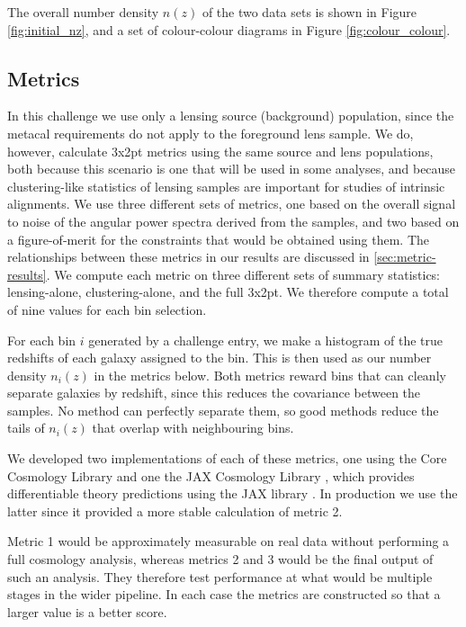 \documentclass[twocolumn,twocolappendix]{aastex63}
\begin{document}
The overall number density $n(z)$ of the two data sets is shown in Figure \ref{fig:initial_nz},
and a set of colour-colour diagrams  in Figure \ref{fig:colour_colour}.

\subsection{Metrics}
\label{sec:metrics}

In this challenge we use only a lensing source (background) population, since the metacal requirements
do not apply to the foreground lens sample. We do, however, calculate 3x2pt metrics using the
same source and lens populations, both because this scenario is one that will be used in some analyses,
and because clustering-like statistics of lensing samples are important for studies of intrinsic
alignments. We use three different sets of metrics, one based on the overall signal to noise of the angular power spectra 
derived from the samples, and two based on a figure-of-merit for the constraints that would be obtained 
using them. The relationships between these metrics in our results are discussed in \autoref{sec:metric-results}.
We compute each metric on three different sets of summary statistics: lensing-alone, clustering-alone,
and the full 3x2pt. We therefore compute a total of nine values for each bin selection.

For each bin $i$ generated by a challenge entry, we make a histogram of the true redshifts 
of each galaxy assigned to the bin.  This is then used as our number density $n_i(z)$ in the metrics 
below. Both metrics reward bins that can
cleanly separate galaxies by redshift, since this reduces the covariance between the samples. No
method can perfectly separate them, so good methods reduce the tails of $n_i(z)$ that overlap with 
neighbouring bins.

We developed two implementations of each of these metrics, one using the Core Cosmology Library 
\citep{ccl} and one the JAX Cosmology Library \citep{jax-cosmo}, which provides differentiable theory 
predictions using the JAX library \citep{jax}.  In production we use the latter since it provided a
more stable calculation of metric 2.

Metric 1 would be approximately measurable on real data without performing a full cosmology analysis,
whereas metrics 2 and 3 would be the final output of such an analysis.  They therefore test performance at what
would be multiple stages in the wider pipeline. In each case the metrics are constructed so that a larger
value is a better score.
\end{document}

